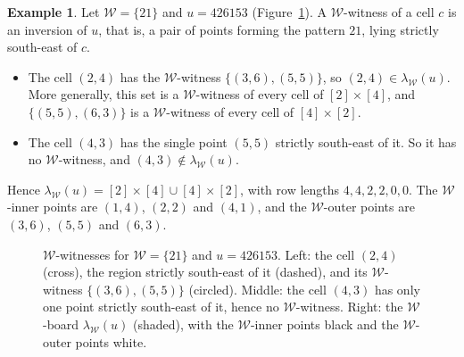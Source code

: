 \documentclass[11pt]{amsart}
\theoremstyle{definition}
\newtheorem{example}[theorem]{Example}
\theoremstyle{remark}
\newcommand{\cW}{\mathcal{W}}
\newcommand{\gridlines}[2]{\draw[gray!55,very thin] (0,0) grid (#1,-#2);}
\newcommand{\shaderows}[2][gray!22]{\foreach \x/\y in {#2}{\fill[#1] (0,1-\x) rectangle (\y,-\x);}}
\newcommand{\pt}[2]{\fill (#2-0.5,0.5-#1) circle (0.16);}
\newcommand{\opt}[2]{\draw[semithick,fill=white] (#2-0.5,0.5-#1) circle (0.16);}
\newcommand{\crosscell}[2]{\draw[thick] (#2-0.8,0.2-#1) -- (#2-0.2,0.8-#1); \draw[thick] (#2-0.8,0.8-#1) -- (#2-0.2,0.2-#1);}
\newcommand{\wit}[2]{\draw[thick] (#2-0.5,0.5-#1) circle (0.34);}
\begin{document}
\begin{example}\label{ex:witness}
Let $\cW=\{21\}$ and $u=426153$ (Figure~\ref{fig:witness}). A $\cW$-witness of a cell $c$ is an inversion of $u$, that is, a pair of points forming the pattern $21$, lying strictly south-east of $c$.
\begin{itemize}
\item The cell $(2,4)$ has the $\cW$-witness $\{(3,6),(5,5)\}$, so $(2,4)\in\lambda_\cW(u)$. More generally, this set is a $\cW$-witness of every cell of $[2]\times[4]$, and $\{(5,5),(6,3)\}$ is a $\cW$-witness of every cell of $[4]\times[2]$.
\item The cell $(4,3)$ has the single point $(5,5)$ strictly south-east of it. So it has no $\cW$-witness, and $(4,3)\notin\lambda_\cW(u)$.
\end{itemize}
Hence $\lambda_\cW(u)=[2]\times[4]\cup[4]\times[2]$, with row lengths $4,4,2,2,0,0$. The $\cW$-inner points are $(1,4)$, $(2,2)$ and $(4,1)$, and the $\cW$-outer points are $(3,6)$, $(5,5)$ and $(6,3)$.
\end{example}

\begin{figure}[ht]
\centering
{}
\qquad
{}
\qquad
{}
\caption{$\cW$-witnesses for $\cW=\{21\}$ and $u=426153$. Left: the cell $(2,4)$ (cross), the region strictly south-east of it (dashed), and its $\cW$-witness $\{(3,6),(5,5)\}$ (circled). Middle: the cell $(4,3)$ has only one point strictly south-east of it, hence no $\cW$-witness. Right: the $\cW$-board $\lambda_\cW(u)$ (shaded), with the $\cW$-inner points black and the $\cW$-outer points white.}\label{fig:witness}
\end{figure}
\end{document}

